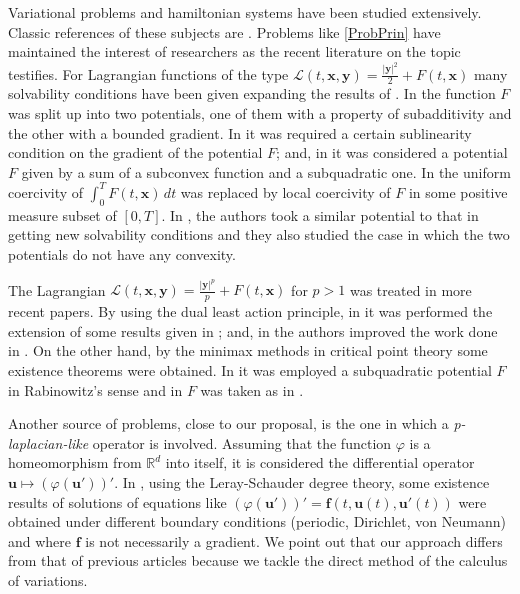 \documentclass[twoside]{elsarticle}
\theoremstyle{remark}
\renewcommand{\b}[1]{\boldsymbol{#1}}
\newcommand{\rr}{\mathbb{R}}
\begin{document}
Variational problems and hamiltonian systems  have been studied extensively. Classic references of these subjects are
\cite{mawhin2010critical,struwe2008variational,ekeland1999convex}. Problems like \eqref{ProbPrin} have maintained the interest of researchers as the recent literature on the topic testifies. 
For Lagrangian functions of the type $\mathcal{L}(t,\b{x},\b{y})=\frac{|\b{y}|^2}{2}+F(t,\b{x})$  many solvability conditions have been given expanding the results of \cite{mawhin2010critical}.  
In  \cite{tang1995periodic} the function $F$ was split up into two potentials, one of them with a property of subadditivity and the other with a bounded gradient.
In \cite{tang1998periodic} it was required a certain sublinearity condition on the gradient of the potential $F$; and, 
in \cite{wu1999periodic} it was considered a potential $F$ given by a sum of a subconvex function and a  subquadratic one. 
In  \cite{tang2001periodic} the uniform coercivity of $\int_0^T F(t,\b{x})\,dt$
was replaced by local coercivity of $F$ in some positive measure subset of $[0,T]$.
In \cite{zhao2004periodic}, the authors took a similar potential to that in \cite{wu1999periodic} getting new solvability conditions 
and they also studied the case in which the two potentials do not have any convexity.


The Lagrangian  $\mathcal{L}(t,\b{x},\b{y})=\frac{|\b{y}|^p}{p}+F(t,\b{x})$
for $p>1$ was treated in more recent papers.
By using the dual least action principle, in \cite{Tian2007192}
it was performed the extension of some results given in \cite{mawhin2010critical};
and, in \cite{tang2010periodic} the authors improved the work done in \cite{wu1999periodic}.
On the other hand, by the minimax methods in critical point theory 
some existence theorems were obtained.
In \cite{xu2007some} it was employed a subquadratic potential $F$ in Rabinowitz{}'s sense and in \cite{ye2008periodic} $F$ was taken as in \cite{tang1998periodic}.

Another source of problems, close to our proposal, is the one in which a \emph {p-laplacian-like} operator is involved.
Assuming that the function $\varphi$ is a homeomorphism  from $\rr^d$ into itself, it is considered the differential operator
$\b u \mapsto (\varphi(\b u'))'$. 
In  \cite{C-2007,C-2009, 
Cristia-2008, manasevich2000boundary, manasevich1998periodic}, using 
the Leray-Schauder degree theory,
some existence results of solutions of equations 
like 
$(\varphi({\b u}'))'={\b f}(t,{\b u}(t),{\b u}'(t))$ were obtained 
under different boundary conditions (periodic, Dirichlet, von Neumann) 
and where $\b f$ is not necessarily a gradient. 
We point out that our approach 
differs from that of previous articles because
we tackle the direct method of the calculus of variations.
\end{document}
